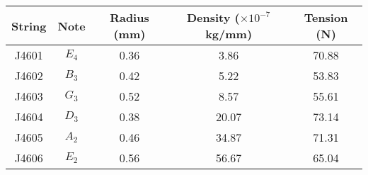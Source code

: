 \begin{tabular}{ccccc}
\toprule
String &   Note &  Radius (mm) &  Density ($\times 10^{-7}$ kg/mm) &  Tension (N) \\
\midrule
 J4601 &  $E_4$ &         0.36 &                              3.86 &        70.88 \\
 J4602 &  $B_3$ &         0.42 &                              5.22 &        53.83 \\
 J4603 &  $G_3$ &         0.52 &                              8.57 &        55.61 \\
 J4604 &  $D_3$ &         0.38 &                             20.07 &        73.14 \\
 J4605 &  $A_2$ &         0.46 &                             34.87 &        71.31 \\
 J4606 &  $E_2$ &         0.56 &                             56.67 &        65.04 \\
\bottomrule
\end{tabular}


